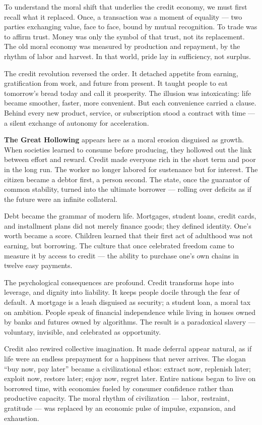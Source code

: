 \documentclass[11pt,twoside]{book}
\begin{document}
To understand the moral shift that underlies the credit economy, we must first recall what it replaced.  
Once, a transaction was a moment of equality --- two parties exchanging value, face to face, bound by mutual recognition.  
To trade was to affirm trust.  Money was only the symbol of that trust, not its replacement.  
The old moral economy was measured by production and repayment, by the rhythm of labor and harvest.  
In that world, pride lay in sufficiency, not surplus.

The credit revolution reversed the order.  
It detached appetite from earning, gratification from work, and future from present.  
It taught people to eat tomorrow’s bread today and call it prosperity.  
The illusion was intoxicating: life became smoother, faster, more convenient.  
But each convenience carried a clause.  
Behind every new product, service, or subscription stood a contract with time --- a silent exchange of autonomy for acceleration.

\textbf{The Great Hollowing} appears here as a moral erosion disguised as growth.  
When societies learned to consume before producing, they hollowed out the link between effort and reward.  
Credit made everyone rich in the short term and poor in the long run.  
The worker no longer labored for sustenance but for interest.  
The citizen became a debtor first, a person second.  
The state, once the guarantor of common stability, turned into the ultimate borrower --- rolling over deficits as if the future were an infinite collateral.

Debt became the grammar of modern life.  
Mortgages, student loans, credit cards, and installment plans did not merely finance goods; they defined identity.  
One’s worth became a score.  
Children learned that their first act of adulthood was not earning, but borrowing.  
The culture that once celebrated freedom came to measure it by access to credit --- the ability to purchase one’s own chains in twelve easy payments.

The psychological consequences are profound.  
Credit transforms hope into leverage, and dignity into liability.  
It keeps people docile through the fear of default.  
A mortgage is a leash disguised as security; a student loan, a moral tax on ambition.  
People speak of financial independence while living in houses owned by banks and futures owned by algorithms.  
The result is a paradoxical slavery --- voluntary, invisible, and celebrated as opportunity.

Credit also rewired collective imagination.  
It made deferral appear natural, as if life were an endless prepayment for a happiness that never arrives.  
The slogan “buy now, pay later” became a civilizational ethos: extract now, replenish later; exploit now, restore later; enjoy now, regret later.  
Entire nations began to live on borrowed time, with economies fueled by consumer confidence rather than productive capacity.  
The moral rhythm of civilization --- labor, restraint, gratitude --- was replaced by an economic pulse of impulse, expansion, and exhaustion.
\end{document}
